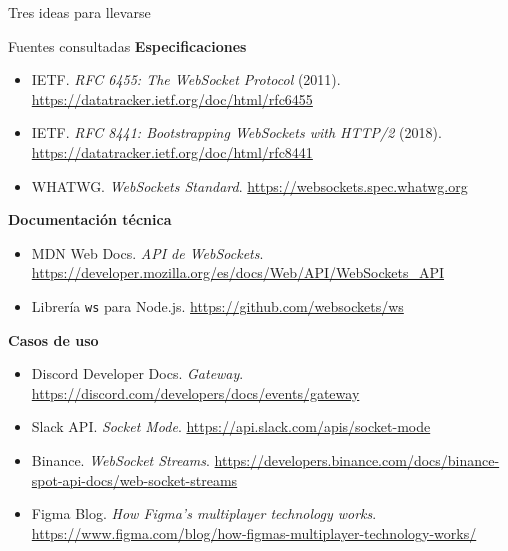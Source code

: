 \documentclass[aspectratio=169,11pt]{beamer}
\newcommand{\bloqueactual}{0}
\newcommand{\quienhabla}{}
\newcommand{\seccion}[2]{\gdef\bloqueactual{#1}\gdef\quienhabla{#2}}
\begin{document}
\seccion{8}{Todos}
\begin{frame}{Tres ideas para llevarse}
  \centering
\end{frame}

\begin{frame}{Fuentes consultadas}
  \scriptsize
  \textbf{Especificaciones}
  \begin{itemize}
    \item IETF. \emph{RFC 6455: The WebSocket Protocol} (2011). \url{https://datatracker.ietf.org/doc/html/rfc6455}
    \item IETF. \emph{RFC 8441: Bootstrapping WebSockets with HTTP/2} (2018). \url{https://datatracker.ietf.org/doc/html/rfc8441}
    \item WHATWG. \emph{WebSockets Standard}. \url{https://websockets.spec.whatwg.org}
  \end{itemize}
  \textbf{Documentación técnica}
  \begin{itemize}
    \item MDN Web Docs. \emph{API de WebSockets}. \url{https://developer.mozilla.org/es/docs/Web/API/WebSockets_API}
    \item Librería \texttt{ws} para Node.js. \url{https://github.com/websockets/ws}
  \end{itemize}
  \textbf{Casos de uso}
  \begin{itemize}
    \item Discord Developer Docs. \emph{Gateway}. \url{https://discord.com/developers/docs/events/gateway}
    \item Slack API. \emph{Socket Mode}. \url{https://api.slack.com/apis/socket-mode}
    \item Binance. \emph{WebSocket Streams}. \url{https://developers.binance.com/docs/binance-spot-api-docs/web-socket-streams}
    \item Figma Blog. \emph{How Figma’s multiplayer technology works}. \url{https://www.figma.com/blog/how-figmas-multiplayer-technology-works/}
  \end{itemize}
\end{frame}
\end{document}
